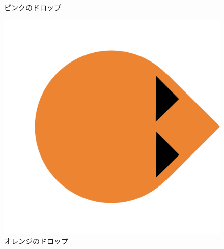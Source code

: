 \documentclass[a4]{jsarticle}
\begin{document}
\begin{figure}[htbp]
\begin{minipage}[t]{0.3\hsize}
\begin{center}
			\caption{ピンクのドロップ}
			\label{fig:pink_drop}
		\end{center}
	\end{minipage}
	\begin{minipage}[t]{0.3\hsize}
		\begin{center}
			\includegraphics[scale=0.2]{../imgs2/enemy.png}
			\caption{オレンジのドロップ}
			\label{fig:pink_drop}
		\end{center}
	\end{minipage}
\end{figure}
\end{document}
